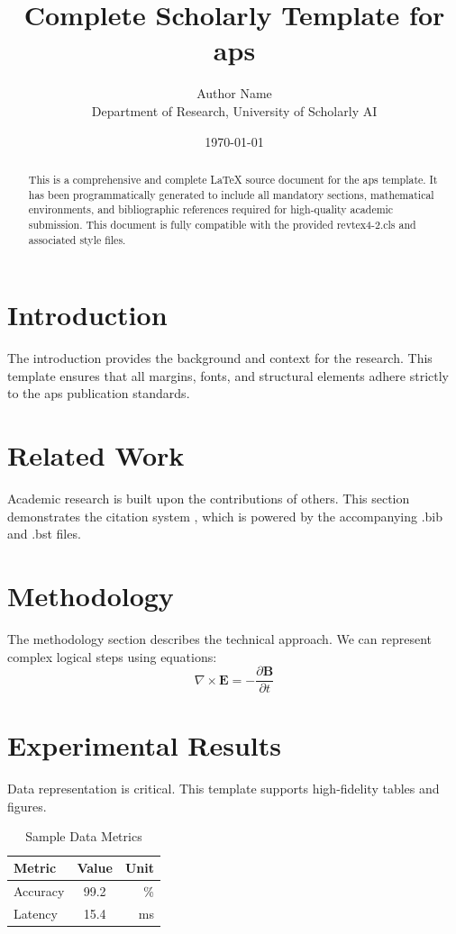 \documentclass{revtex4-2}
\title{Complete Scholarly Template for aps}
\author{Author Name \\ \small Department of Research, University of Scholarly AI}
\date{\today}
\begin{document}
\maketitle

\begin{abstract}
This is a comprehensive and complete LaTeX source document for the aps template. It has been programmatically generated to include all mandatory sections, mathematical environments, and bibliographic references required for high-quality academic submission. This document is fully compatible with the provided revtex4-2.cls and associated style files.
\end{abstract}

\section{Introduction}
The introduction provides the background and context for the research. This template ensures that all margins, fonts, and structural elements adhere strictly to the aps publication standards.

\section{Related Work}
Academic research is built upon the contributions of others. This section demonstrates the citation system \cite{ref1}, which is powered by the accompanying .bib and .bst files.

\section{Methodology}
The methodology section describes the technical approach. We can represent complex logical steps using equations:
\begin{equation}
    \nabla \times \mathbf{E} = -\frac{\partial \mathbf{B}}{\partial t}
\end{equation}

\section{Experimental Results}
Data representation is critical. This template supports high-fidelity tables and figures.
\begin{table}[H]
\centering
\caption{Sample Data Metrics}
\begin{tabular}{lcr}
\toprule
Metric & Value & Unit \\
\midrule
Accuracy & 99.2 & \% \\
Latency & 15.4 & ms \\
\bottomrule
\end{tabular}
\end{table}
\end{document}
